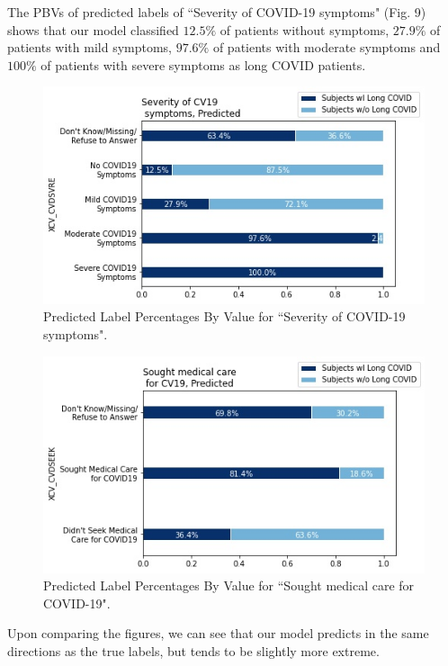 \documentclass{article}
\begin{document}
The PBVs of predicted labels of ``Severity of COVID-19 symptoms" (Fig. 9) shows that our model classified $12.5\%$ of patients without symptoms, $27.9\%$ of patients with mild symptoms, $97.6\%$ of patients with moderate symptoms and $100\%$ of patients with severe symptoms as long COVID patients. 

\begin{figure}[H]
    \centering
    \includegraphics[width= \columnwidth]{Figure9.jpeg}
   \caption{Predicted Label Percentages By Value for ``Severity of COVID-19 symptoms".}
  \end{figure}
  

  \begin{figure}[H]
    \center
    \includegraphics[width= \columnwidth]{Figure10.jpeg}
    \caption{Predicted Label Percentages By Value for ``Sought medical care for COVID-19".}
  \end{figure}

Upon comparing the figures, we can see that our model predicts in the same directions as the true labels, but tends to be slightly more extreme. 
\end{document}
